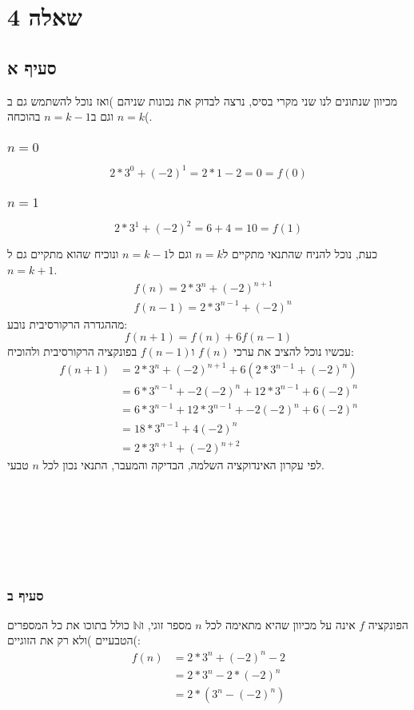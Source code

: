 \documentclass[11pt, oneside]{article}
\newcommand{\qed}{\R{$\blacksquare$}}
\newcommand{\mN}{\mathbb{N}}
\begin{document}
\section{שאלה 4}
\subsection{סעיף א}
מכיוון שנתונים לנו שני מקרי בסיס, נרצה לבדוק את נכונות שניהם )ואז נוכל להשתמש גם ב$n = k$ וגם ב$n = k - 1$ בהוכחה(.

\subsubsection{$n = 0$}
$$2 * 3^0 + (-2)^1 = 2 * 1 - 2 = 0 = f(0)$$

\subsubsection{$n = 1$}
$$2 * 3^1 + (-2)^2 = 6 + 4 = 10 = f(1)$$

כעת, נוכל להניח שהתנאי מתקיים ל$n = k$ וגם ל$n = k - 1$ ונוכיח שהוא מתקיים גם ל$n = k + 1$.
\begin{align*}
& f(n) = 2 * 3^n + (−2)^{n+1}\\
& f(n-1) = 2 * 3^{n-1} + (-2)^n
\end{align*}
מההגדרה הרקורסיבית נובע:
$$f(n + 1) = f(n) + 6f(n-1)$$
עכשיו נוכל להציב את ערכי $f(n)$ ו$f(n-1)$ בפונקציה הרקורסיבית ולהוכיח:
\begin{align*}
f(n+1) & = 2 * 3^n + (−2)^{n+1} + 6(2 * 3^{n-1} + (-2)^n)\\
& = 6 * 3^{n-1} + -2(-2)^n + 12 * 3^{n-1} + 6(-2)^n\\
& = 6 * 3^{n-1} + 12 * 3^{n-1} + -2(-2)^n + 6(-2)^n\\
& = 18 * 3^{n-1} + 4(-2)^n\\
& = 2 * 3^{n+1} + (-2)^{n+2}
\end{align*}
לפי עקרון האינדוקציה השלמה, הבדיקה והמעבר, התנאי נכון לכל $n$ טבעי.\\\\\\\\\\\\\\
\qed

\subsubsection{סעיף ב}
הפונקציה $f$ אינה על מכיוון שהיא מתאימה לכל $n$ מספר זוגי, ו$\mN$ כולל בתוכו את כל המספרים הטבעיים )ולא רק את הזוגיים(:
\begin{align*}
f(n) & = 2 * 3^n + (-2)^n -2\\
& = 2 * 3^n - 2 * (-2)^n\\
& = 2 * (3^n - (-2)^n)
\end{align*}
\qed
\end{document}
